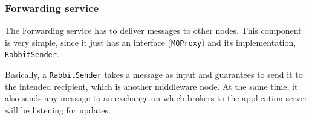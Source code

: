 \subsubsection{Forwarding service}
The Forwarding service has to deliver messages to other nodes. This component
is very simple, since it just has an interface (\texttt{MQProxy}) and its
implementation, \texttt{RabbitSender}.

Basically, a \texttt{RabbitSender} takes a message as input and guarantees to
send it to the intended recipient, which is another middleware node.
At the same time, it also sends any message to an exchange on which brokers to
the application server will be listening for updates.
